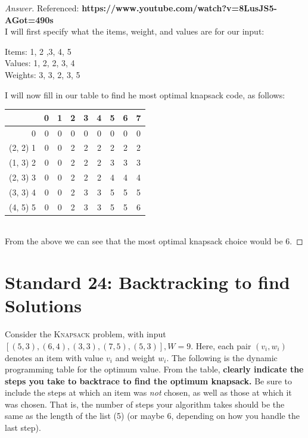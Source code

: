 \documentclass[11pt]{article}
\theoremstyle{definition}
\theoremstyle{definition}
\theoremstyle{definition}
\begin{document}
\begin{proof}[Answer] Referenced: \textbf{https://www.youtube.com/watch?v=8LusJS5-AGot=490s}\\
I will first specify what the items, weight, and values are for our input: \\
\begin{center}
Items: 1, 2 ,3, 4, 5 \\
Values: 1, 2, 2, 3, 4 \\
Weights: 3, 3, 2, 3, 5 \\
\end{center}
I will now fill in our table to find he most optimal knapsack code, as follows: \\
\begin{tabular}{|r|c|c|c|c|c|c|c|c|}
\hline
& 0& 1& 2& 3& 4& 5& 6& 7 \\ 
 \hline
0 & 0 & 0 & 0 & 0 & 0 & 0 & 0 & 0  \\ 
\hline
(2, 2) 1 & 0 & 0 & 2 & 2 & 2 & 2 & 2 & 2  \\ 
\hline
(1, 3) 2 & 0 & 0 & 2 & 2 & 2 & 3 & 3 & 3  \\ 
\hline
(2, 3) 3 & 0 & 0 & 2 & 2 & 2 & 4 & 4 & 4  \\ 
\hline
(3, 3) 4 & 0 & 0 & 2 & 3 & 3 & 5 & 5 & 5  \\ 
\hline
(4, 5) 5 & 0 & 0 & 2 & 3 & 3 & 5 & 5 & 6  \\ 
\hline
\end{tabular}\\


From the above we can see that the most optimal knapsack choice would be 6.
\end{proof}

\newpage
\section{Standard 24: Backtracking to find Solutions}
Consider the \textsc{Knapsack} problem, with input $[ (5, 3), (6, 4), (3, 3), (7, 5),(5, 3)], W=9$. Here, each pair $(v_i, w_i)$ denotes an item with value $v_i$ and weight $w_i$. The following is the dynamic programming table for the optimum value. From the table, \textbf{clearly indicate the steps you take to backtrace to find the optimum knapsack.} Be sure to include the steps at which an item was \emph{not} chosen, as well as those at which it was chosen. That is, the number of steps your algorithm takes should be the same as the length of the list (5) (or maybe 6, depending on how you handle the last step). 
\end{document}
